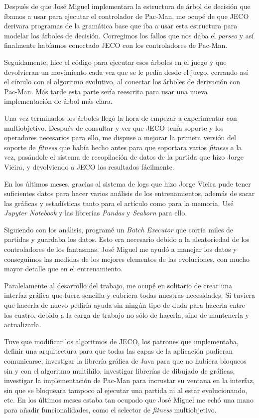 Después de que José Miguel implementara la estructura de árbol de decisión que íbamos a usar para ejecutar el controlador de Pac-Man, me ocupé de que JECO derivara programas de la gramática base que iba a usar esta estructura para modelar los árboles de decisión. Corregimos los fallos que nos daba el \textit{parseo} y así finalmente habíamos conectado JECO con los controladores de Pac-Man.

Seguidamente, hice el código para ejecutar esos árboles en el juego y que devolvieran un movimiento cada vez que se le pedía desde el juego, cerrando así el círculo con el algoritmo evolutivo, al conectar los árboles de derivación con Pac-Man. Más tarde esta parte sería reescrita para usar una nueva implementación de árbol más clara.

Una vez terminados los árboles llegó la hora de empezar a experimentar con multiobjetivo. Después de consultar y ver que JECO tenía soporte y los operadores necesarios para ello, me dispuse a mejorar la primera versión del soporte de \textit{fitness} que había hecho antes para que soportara varios \textit{fitness} a la vez, pasándole el sistema de recopilación de datos de la partida que hizo Jorge Vieira, y devolviendo a JECO los resultados fácilmente.

En los últimos meses, gracias al sistema de logs que hizo Jorge Vieira pude tener suficientes datos para hacer varios análisis de los entrenamientos, además de sacar las gráficas y estadísticas tanto para el artículo como para la memoria. Usé \textit{Jupyter Notebook} y las librerías \textit{Pandas} y \textit{Seaborn} para ello.

Siguiendo con los análisis, programé un \textit{Batch Executor} que corría miles de partidas y guardaba los datos. Esto era necesario debido a la aleatoriedad de los controladores de los fantasmas. José Miguel me ayudó a manejar los datos y conseguimos las medidas de los mejores elementos de las evoluciones, con mucho mayor detalle que en el entrenamiento.

Paralelamente al desarrollo del trabajo, me ocupé en solitario de crear una interfaz gráfica que fuera sencilla y cubriera todas nuestras necesidades. Si tuviera que hacerla de nuevo pediría ayuda sin ningún tipo de duda para hacerla entre los cuatro, debido a la carga de trabajo no sólo de hacerla, sino de mantenerla y actualizarla.

Tuve que modificar los algoritmos de JECO, los patrones que implementaba, definir una arquitectura para que todas las capas de la aplicación pudieran comunicarse, investigar la librería gráfica de Java para que no hubiera bloqueos sin y con el algoritmo multihilo, investigar librerías de dibujado de gráficas, investigar la implementación de Pac-Man para incrustar su ventana en la interfaz, sin que se bloqueara tampoco al ejecutar una partida ni al estar evolucionando, etc.
En los últimos meses estaba tan ocupado que José Miguel me echó una mano para añadir funcionalidades, como el selector de \textit{fitness} multiobjetivo.

